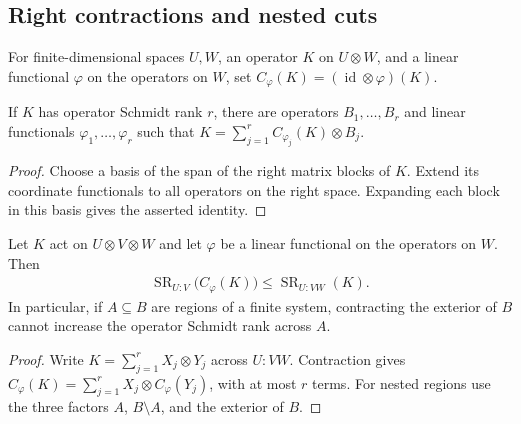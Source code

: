 \subsection{Right contractions and nested cuts}

\begin{definition}
    \label{def:operator_right_contraction}
    \leanok
    For finite-dimensional spaces $U,W$, an operator $K$ on $U\otimes W$, and a
    linear functional $\varphi$ on the operators on $W$, set
    $C_\varphi(K)=(\operatorname{id}\otimes\varphi)(K)$.
\end{definition}

\begin{theorem}
    \label{thm:operator_right_contraction_decomposition}
    \leanok
    If $K$ has operator Schmidt rank $r$, there are operators $B_1,\ldots,B_r$
    and linear functionals $\varphi_1,\ldots,\varphi_r$ such that
    $K=\sum_{j=1}^r C_{\varphi_j}(K)\otimes B_j$.
\end{theorem}
\begin{proof}
    \leanok
    Choose a basis of the span of the right matrix blocks of $K$.
    Extend its coordinate functionals to all operators on the right space.
    Expanding each block in this basis gives the asserted identity.
\end{proof}

\begin{theorem}
    \label{thm:operator_right_contraction_rank}
    \leanok
    Let $K$ act on $U\otimes V\otimes W$ and let $\varphi$ be a linear
    functional on the operators on $W$. Then
    \begin{align*}
        \operatorname{SR}_{U:V}\bigl(C_\varphi(K)\bigr)
        \leq \operatorname{SR}_{U:VW}(K).
    \end{align*}
    In particular, if $A\subseteq B$ are regions of a finite system,
    contracting the exterior of $B$ cannot increase the operator Schmidt
    rank across $A$.
\end{theorem}
\begin{proof}
    \leanok
    Write $K=\sum_{j=1}^r X_j\otimes Y_j$ across $U:VW$.
    Contraction gives $C_\varphi(K)=\sum_{j=1}^r
        X_j\otimes C_\varphi(Y_j)$, with at most $r$ terms.
    For nested regions use the three factors $A$, $B\setminus A$, and
    the exterior of $B$.
\end{proof}

